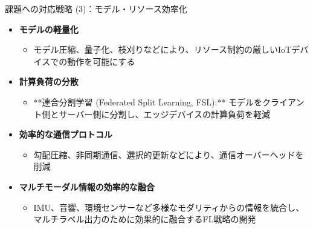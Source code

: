 \documentclass[unicode,12pt,aspectratio=169,dvipdfmx]{beamer}
\begin{document}
\begin{frame}{課題への対応戦略 (3)：モデル・リソース効率化}
\begin{itemize}
    \item \textbf{モデルの軽量化}
    \begin{itemize}
        \item モデル圧縮、量子化、枝刈りなどにより、リソース制約の厳しいIoTデバイスでの動作を可能にする
    \end{itemize}
    \item \textbf{計算負荷の分散}
    \begin{itemize}
        \item **連合分割学習 (Federated Split Learning, FSL):** モデルをクライアント側とサーバー側に分割し、エッジデバイスの計算負荷を軽減
    \end{itemize}
    \item \textbf{効率的な通信プロトコル}
    \begin{itemize}
        \item 勾配圧縮、非同期通信、選択的更新などにより、通信オーバーヘッドを削減
    \end{itemize}
    \item \textbf{マルチモーダル情報の効率的な融合}
    \begin{itemize}
        \item IMU、音響、環境センサーなど多様なモダリティからの情報を統合し、マルチラベル出力のために効果的に融合するFL戦略の開発
    \end{itemize}
\end{itemize}
\end{frame}
\end{document}
